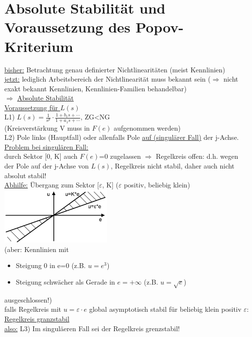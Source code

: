 \documentclass[openany,a4paper,11pt]{book}
\begin{document}
\section[Grundlagen]{Absolute Stabilität und Voraussetzung des Popov-Kriterium}
\uline{bisher:} Betrachtung genau definierter Nichtlinearitäten (meist Kennlinien)\\
\uline{jetzt:} lediglich Arbeitsbereich der Nichtlinearität muss bekannt sein ($\Rightarrow$ nicht exakt bekannt Kennlinien, Kennlinien-Familien behandelbar)\\
$\Rightarrow$ \uline{Absolute Stabilität}  \\ 
\uline{Voraussetzung für $L(s)$}  \\
L1) $L(s)=\frac{1}{s^p}\cdot \frac{1+b_1s+\cdots}{1+a_1s+\cdots}$, ZG<NG\\
(Kreisverstärkung V muss in $F(e)$ aufgenommen werden)\\
L2) Pole links (Hauptfall) oder allenfalls Pole \uline{auf (singulärer Fall)} der j-Achse.\\
\uline{Problem bei singulären Fall:}\\ 
durch Sektor [0, K] auch $F(e)$=0 zugelassen $\Rightarrow$ Regelkreis offen: d.h. wegen der Pole auf der j-Achse von $L(s)$, Regelkreis nicht stabil, daher auch nicht absolut stabil!\\
\uline{Abhilfe:} Übergang zum Sektor [$\varepsilon$, K] ($\varepsilon$ positiv, beliebig klein)\\
\includegraphics[width=2.2in]{imgs/NLR66.png}\\
(aber: Kennlinien mit \begin{itemize}
    \item Steigung 0 in e=0 (z.B. $u=e^3$)
    \item Steigung schwächer als Gerade in $e=+\infty$ (z.B. $u=\sqrt{e}$)
\end{itemize}
ausgeschlossen!)\\
falls Regelkreis mit $u=\varepsilon\cdot e$ global asymptotisch stabil für beliebig klein positiv $\varepsilon$: \uline{Regelkreis granzstabil}\\
\uline{also:} L3) Im singuläeren Fall sei der Regelkreis grenzstabil!
\end{document}
